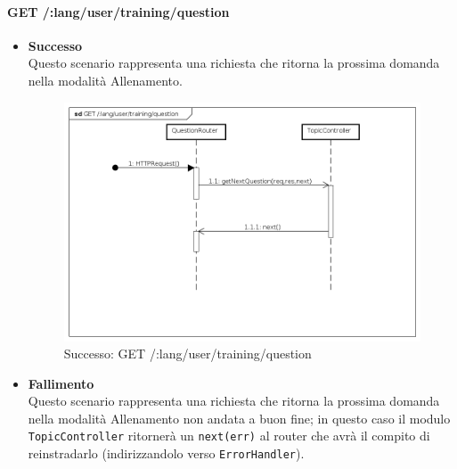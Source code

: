 \paragraph{GET /:lang/user/training/question} %
\begin{itemize}
\item \textbf{Successo}\\
Questo scenario rappresenta una richiesta che ritorna la prossima domanda nella modalità Allenamento.

\begin{figure}[ht]
	\centering
	\includegraphics[scale=0.45]{UML/DiagrammiDiSequenza/Back-end/GET__lang_user_training_question_success.png}
	\caption{Successo: GET /:lang/user/training/question}
\end{figure}
\FloatBarrier

\item \textbf{Fallimento}\\
Questo scenario rappresenta una richiesta che ritorna la prossima domanda nella modalità Allenamento non andata a buon fine; in questo caso il modulo \texttt{TopicController} ritornerà un \texttt{next(err)} al router che avrà il compito di reinstradarlo (indirizzandolo verso \texttt{ErrorHandler}).


\end{itemize}

